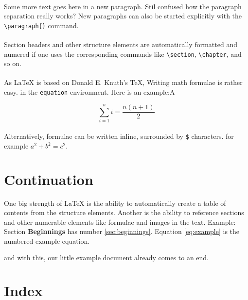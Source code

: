 \documentclass{article}
\begin{document}
\paragraph{} Some more text goes here in a new paragraph.
Stil confused how the paragraph separation really works?
New paragraphs can also be started explicitly with the \verb|\paragraph{}| command.



\paragraph{} Section headers and other structure elements are automatically formatted and numered
if one uses the corresponding commands like \verb|\section|, \verb|\chapter|, and
so on.


\paragraph{} As {\LaTeX} is based on Donald E. Knuth's {\TeX},
Writing math formulae is rather easy. in the \verb+equation+ environment.
Here is an example:A


\begin{equation}
\label{eq:example}
\sum_{i=1}^{n}i = \frac{n(n+1)}{2}
\end{equation}

\paragraph{} Alternatively, formulae can be written inline, surrounded
by \verb|$| characters. for example $a^2 + b^2 = c^2$.

\section{Continuation}

\paragraph{}One big strength of {\LaTeX} is the ability to automatically create a table of contents from the
structure elements. Another is the ability to reference  sections and other numerable elements like formulae
and images in the text. Example: Section \textbf{Beginnings} has number \ref{sec:beginnings}.
Equation \ref{eq:example} is the numbered example equation.





and with this, our little example document already comes to an end.



\section*{Index}

\printindex
\end{document}

